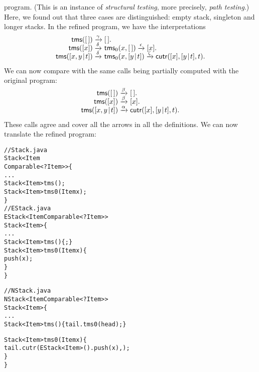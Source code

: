 program. (This is an instance of \emph{structural
  testing}, more precisely,
\emph{path testing}.) Here, we found out
that three cases are distinguished: empty stack, singleton and longer
stacks. In the refined program, we have the interpretations
\begin{equation*}
\begin{array}{@{}r@{\;}l@{\;}l@{}}
\fun{tms}(\el) & \xrightarrow{\smash{\gamma}} & \el.\\
\fun{tms}([x]) & \xrightarrow{\smash{\delta}} & \fun{tms}_0(x,\el)
                 \xrightarrow{\smash{\epsilon}} [x].\\
\fun{tms}(\cons{x,y}{t})
  & \xrightarrow{\smash{\delta}} & \fun{tms}_0(x,\cons{y}{t})
    \xrightarrow{\smash{\zeta}} \fun{cutr}([x],\cons{y}{t},t).
\end{array}
\end{equation*}
We can now compare with the same calls being partially computed with
the original program:
\begin{equation*}
\begin{array}{@{}r@{\;}l@{\;}l@{}}
\fun{tms}(\el) & \xrightarrow{\smash{\beta}} & \el.\\
\fun{tms}([x]) & \xrightarrow{\smash{\beta}} & [x].\\
\fun{tms}(\cons{x,y}{t}) & \xrightarrow{\smash{\alpha}}
                         & \fun{cutr}([x],\cons{y}{t},t).
\end{array}
\end{equation*}
These calls agree and cover all the arrows in all the definitions. We
can now translate the refined program:
\begin{alltt}
// Stack.java
\public \abstractX \class Stack<Item
\hfill\extends Comparable<? \super Item>> \{
  ...
  \public \abstractX Stack<Item> tms();
  \protectedX \abstractX Stack<Item> tms0(\final Item x);
\}
// EStack.java
\public \class EStack<Item \extends Comparable<? \super Item>>
       \extends Stack<Item> \{
  ...
  \public Stack<Item> tms() \{ \return \this; \}
  \protectedX Stack<Item> tms0(\final Item x) \{
    \return push(x);
  \}
\}

// NStack.java
\public \class NStack<Item \extends Comparable<? \super Item>>
       \extends Stack<Item> \{
  ...
  \public Stack<Item> tms() \{ \return tail.tms0(head); \}

  \protectedX Stack<Item> tms0(\final Item x) \{
    \return tail.cutr(\new EStack<Item>().push(x),\this);
  \}
\}
\end{alltt}

